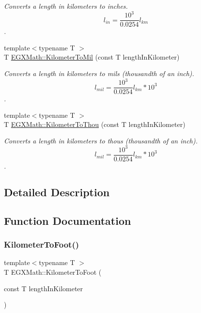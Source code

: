 \begin{DoxyCompactItemize}
\begin{DoxyCompactList}\small\item\em Converts a length in kilometers to inches. \[ l_{in}= \frac{10^{3}}{0.0254} l_{km} \]. \end{DoxyCompactList}\item 
{\footnotesize template$<$typename T $>$ }\\T \mbox{\hyperlink{group___e_g_x_math-_conversions-_length_conversions-_kilometer-_imperial_ga4d25c16818235ceaad64d1119e23e01f}{E\+G\+X\+Math\+::\+Kilometer\+To\+Mil}} (const T length\+In\+Kilometer)
\begin{DoxyCompactList}\small\item\em Converts a length in kilometers to mils (thousandth of an inch). \[ l_{mil}= \frac{10^{3}}{0.0254} l_{km} * 10^{3} \]. \end{DoxyCompactList}\item 
{\footnotesize template$<$typename T $>$ }\\T \mbox{\hyperlink{group___e_g_x_math-_conversions-_length_conversions-_kilometer-_imperial_gabcd7d2e467bc0e80c61257ba641d0f48}{E\+G\+X\+Math\+::\+Kilometer\+To\+Thou}} (const T length\+In\+Kilometer)
\begin{DoxyCompactList}\small\item\em Converts a length in kilometers to thous (thousandth of an inch). \[ l_{mil}= \frac{10^{3}}{0.0254} l_{km} * 10^{3} \]. \end{DoxyCompactList}\end{DoxyCompactItemize}


\subsection{Detailed Description}


\subsection{Function Documentation}
\mbox{\label{group___e_g_x_math-_conversions-_length_conversions-_kilometer-_imperial_ga8e07a35f01e011462db88b5cb2896416}} 
\subsubsection{\texorpdfstring{Kilometer\+To\+Foot()}{KilometerToFoot()}}
{\footnotesize\ttfamily template$<$typename T $>$ \\
T E\+G\+X\+Math\+::\+Kilometer\+To\+Foot (\begin{DoxyParamCaption}\item[{const T}]{length\+In\+Kilometer }\end{DoxyParamCaption})}



